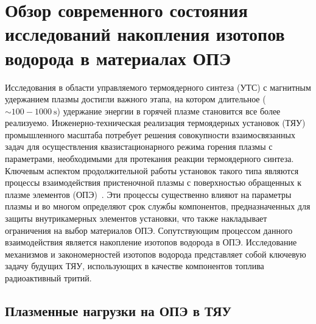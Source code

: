\chapter{Обзор современного состояния исследований накопления изотопов водорода в материалах ОПЭ}\label{ch:ch1}


Исследования в области управляемого термоядерного синтеза (УТС) с магнитным удержанием плазмы достигли важного этапа, на котором длительное ($\sim100-\SI{1000}{\second}$) удержание энергии в горячей плазме становится все более реализуемо. Инженерно-техническая реализация термоядерных установок (ТЯУ) промышленного масштаба потребует решения совокупности взаимосвязанных задач для осуществления квазистационарного режима горения плазмы с параметрами, необходимыми для протекания реакции термоядерного синтеза. Ключевым аспектом продолжительной работы установок такого типа являются процессы взаимодействия пристеночной плазмы с поверхностью обращенных к плазме элементов (ОПЭ)~\cite{Krieger2025}. Эти процессы существенно влияют на параметры плазмы и во многом определяют срок службы компонентов, предназначенных для защиты внутрикамерных элементов установки, что также накладывает ограничения на выбор материалов ОПЭ. Сопутствующим процессом данного взаимодействия является накопление изотопов водорода в ОПЭ. Исследование механизмов и закономерностей изотопов водорода представляет собой ключевую задачу будущих ТЯУ, использующих в качестве компонентов топлива радиоактивный тритий.

\section{Плазменные нагрузки на ОПЭ в ТЯУ}\label{sec:ch1/sec1}

